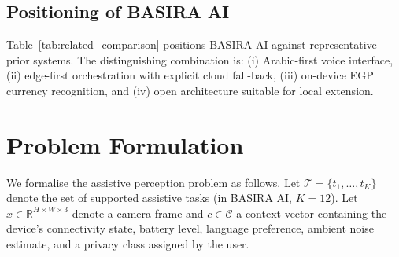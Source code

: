 \documentclass[11pt,a4paper]{article}
\begin{document}
\subsection{Positioning of BASIRA AI}

Table~\ref{tab:related_comparison} positions BASIRA AI against representative
prior systems. The distinguishing combination is: (i) Arabic-first voice
interface, (ii) edge-first orchestration with explicit cloud fall-back,
(iii) on-device EGP currency recognition, and (iv) open architecture suitable
for local extension.

\begin{table}[h]
\caption{Comparison of representative assistive systems with BASIRA AI.}
\centering
\renewcommand{\arraystretch}{1.4}
\label{tab:related_comparison}
\end{table}

\section{Problem Formulation}
\label{sec:problem}

We formalise the assistive perception problem as follows. Let $\mathcal{T}
= \{t_1, \ldots, t_K\}$ denote the set of supported assistive tasks (in
BASIRA AI, $K=12$). Let $x \in \mathbb{R}^{H \times W \times 3}$ denote a
camera frame and $c \in \mathcal{C}$ a context vector containing the
device's connectivity state, battery level, language preference, ambient
noise estimate, and a privacy class assigned by the user.
\end{document}
